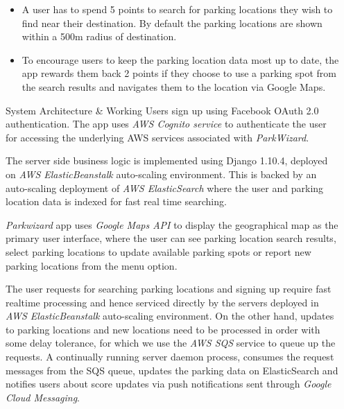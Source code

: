 \documentclass[final]{beamer}
\newlength{\onecolwid}
\newlength{\twocolwid}
\begin{document}
\begin{frame}[t]
\begin{columns}[t]
\begin{column}{\twocolwid}
\end{column} %

\begin{column}{\onecolwid} %

\vspace{-2.2cm}
\begin{block}{}
\vspace{-1.3cm}
\begin{itemize}
\fontsize{34}{40} \selectfont \item A user has to spend 5 points to search for parking locations they wish to find near their destination. By default the parking locations are shown within a 500m radius of destination.

\fontsize{34}{40} \selectfont \item To encourage users to keep the parking location data most up to date, the app rewards them back 2 points if they choose to use a parking spot from the search results and navigates them to the location via Google Maps.
\end{itemize}
\end{block}

\vspace{-1.3cm}
\begin{block}{System Architecture \& Working}
\fontsize{34}{40} \selectfont Users sign up using Facebook OAuth 2.0 authentication. The app uses \textit{AWS Cognito service} to authenticate the user for accessing the underlying AWS services associated with \textit{ParkWizard}.\par

The server side business logic is implemented using Django 1.10.4, deployed on \textit{AWS ElasticBeanstalk} auto-scaling environment. This is backed by an auto-scaling deployment of \textit{AWS ElasticSearch} where the user and parking location data is indexed for fast real time searching.\par

\textit{Parkwizard} app uses \textit{Google Maps API} to display the geographical map as the primary user interface, where the user can see parking location search results, select parking locations to update available parking spots or report new parking locations from the menu option.\par

The user requests for searching parking locations and signing up require fast realtime processing and hence serviced directly by the servers deployed in \textit{AWS ElasticBeanstalk} auto-scaling environment. On the other hand, updates to parking locations and new locations need to be processed in order with some delay tolerance, for which we use the \textit{AWS SQS} service to queue up the requests. A continually running server daemon process, consumes the request messages from the SQS queue, updates the parking data on ElasticSearch and notifies users about score updates via push notifications sent through \textit{Google Cloud Messaging}.
\end{block}



\end{column}
\end{columns}
\end{frame}
\end{document}
